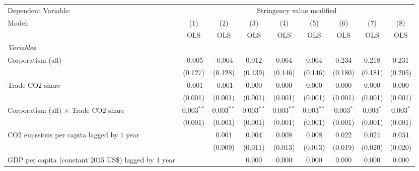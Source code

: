 
\begingroup
\centering
\begin{tabular}{lcccccccc}
   \toprule
   Dependent Variable: & \multicolumn{8}{c}{Stringency value modified}\\
   Model:                                                    & (1)          & (2)          & (3)          & (4)          & (5)          & (6)          & (7)           & (8)\\  
                                                             &  OLS         & OLS          & OLS          & OLS          & OLS          & OLS          & OLS           & OLS\\  
   \midrule
   \emph{Variables}\\
   Corporatism (all)                                         & -0.005       & -0.004       & 0.012        & 0.064        & 0.064        & 0.234        & 0.218         & 0.231\\   
                                                             & (0.127)      & (0.128)      & (0.139)      & (0.146)      & (0.146)      & (0.180)      & (0.181)       & (0.205)\\   
   Trade CO2 share                                           & -0.001       & -0.001       & 0.000        & 0.000        & 0.000        & 0.000        & 0.000         & 0.000\\   
                                                             & (0.001)      & (0.001)      & (0.001)      & (0.001)      & (0.001)      & (0.001)      & (0.001)       & (0.001)\\   
   Corporatism (all) $\times$ Trade CO2 share                & 0.003$^{**}$ & 0.003$^{**}$ & 0.003$^{**}$ & 0.003$^{**}$ & 0.003$^{**}$ & 0.003$^{*}$  & 0.003$^{*}$   & 0.003$^{*}$\\   
                                                             & (0.001)      & (0.001)      & (0.001)      & (0.001)      & (0.001)      & (0.001)      & (0.001)       & (0.001)\\   
   CO2 emissions per capita lagged by 1 year                 &              & 0.001        & 0.004        & 0.008        & 0.008        & 0.022        & 0.024         & 0.034\\   
                                                             &              & (0.009)      & (0.011)      & (0.013)      & (0.013)      & (0.019)      & (0.020)       & (0.020)\\   
   GDP per capita (constant 2015 US\$) lagged by 1 year      &              &              & 0.000        & 0.000        & 0.000        & 0.000        & 0.000         & 0.000\\   

\end{tabular}
